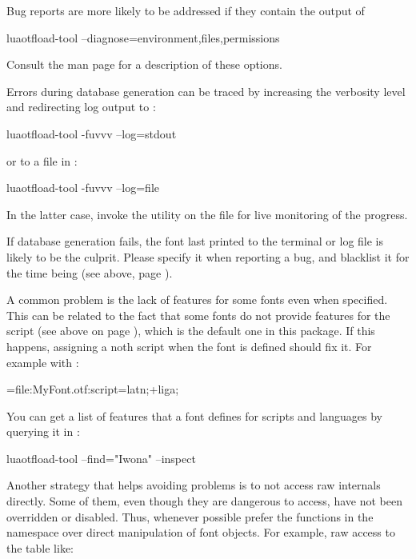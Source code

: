 Bug reports are more likely to be addressed if they contain the output
of

\beginlisting
    luaotfload-tool --diagnose=environment,files,permissions
\endlisting

\noindent Consult the man page for a description of these options.

Errors during database generation can be traced by increasing the
verbosity level and redirecting log output to :

\beginlisting
    luaotfload-tool -fuvvv --log=stdout
\endlisting

\noindent or to a file in :

\beginlisting
    luaotfload-tool -fuvvv --log=file
\endlisting

\noindent In the latter case, invoke the  utility on the
file for live monitoring of the progress.

If database generation fails, the font last printed to the terminal or
log file is likely to be the culprit.
%
Please specify it when reporting a bug, and blacklist it for the time
being (see above, page \pageref{font-blacklist}).

\endsubsection


A common problem is the lack of features for some
\OpenType fonts even when specified.
%
This can be related to the fact that some fonts do not provide features
for the  script (see above on page \pageref{script-tag}),
which is the default one in this package.
%
If this happens, assigning a noth script when the font is defined should
fix it.
%
For example with :

\beginlisting
    \font\test=file:MyFont.otf:script=latn;+liga;
\endlisting

You can get a list of features that a font defines for scripts and
languages by querying it in :

\beginlisting
    luaotfload-tool --find="Iwona" --inspect
\endlisting

\endsubsection


Another strategy that helps avoiding problems is to not access raw
\LUATEX internals directly.
%
Some of them, even though they are dangerous to access, have not been
overridden or disabled.
%
Thus, whenever possible prefer the functions in the 
namespace over direct manipulation of font objects. For example, raw
access to the  table like:

